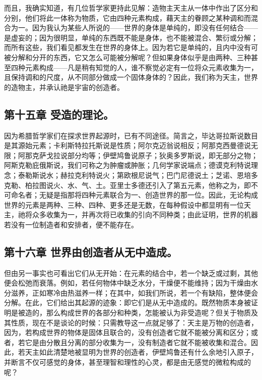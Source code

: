 而且，我确实知道，有几位哲学家更持此见解：造物主天主从一体中作出了区分和分别，他们将此一体称为物质，它由四种元素构成，藉天主的眷顾之某种调和而混合为一。因为我认为某些人所说的——世界的身体是单纯的，即没有任何结合——是虚妄的；因为很明显，单纯的东西既不能是身体，也不能被混合、繁衍或分解；而所有这些，我们看见都发生在世界的身体上。因为若它是单纯的，且内中没有可被分解和分开的东西，它又怎么可能被分解呢？但如果身体似乎是由两种、三种甚至四种元素构成——凡是稍有知觉的人，谁不察觉必定有一位将众元素收集为一，且保持调和的尺度，从不同部分做成一个固体身体的？因此，我们称为天主，世界的造物主，并承认祂是宇宙的创造者。\par


\subsection{第十五章 受造的理论。}

因为希腊哲学家们在探求世界起源时，已有不同途径。简言之，毕达哥拉斯说数目是其源始元素；卡利斯特拉托斯说是性质；阿尔克迈翁说相反；阿那克西曼德说无限；阿那克萨戈拉说部分均等；伊壁鸠鲁说原子；狄奥多罗斯说，即无部分之物；阿斯克勒庇俄斯说，我们可称之为肿瘤或肿胀；几何学家说端点；德谟克利特说理念；泰勒斯说水；赫拉克利特说火；第欧根尼说气；巴门尼德说土；芝诺、恩培多克勒、柏拉图说火、水、气、土。亚里士多德还引入了第五元素，他称之为，即不可命名者；无疑是指那将四种元素联合为一、创造世界的那一位。因此，无论构成世界的元素是两种、三种、四种、更多还是无数，在每种假设中都显明有一位天主，祂将众多收集为一，并再次将已收集的引向不同种类；由此证明，世界的机器若没有一位制造者和安排者，便不能存在。\par


\subsection{第十六章 世界由创造者从无中造成。}

但由另一事实也可看出它们从无开始：在元素的结合中，若一个缺乏或过剩，其他便会松弛而衰落。例如，若任何物体中缺乏水分，干燥便不能维持；因为干燥由水分滋养，正如寒冷由热滋养一样；在其中，如我们所说，若一个有缺陷，整体便会分解。在此，它们给出其起源的迹象：即它们是从无中造成的。既然物质本身被证明是被造的，那么构成世界的各部分和种类，怎能被认为非受造呢？但关于物质及其性质，现在不是谈论的时候：只需教导这一点就足够了：天主是万物的创造者，因为，若构成世界的物体是固体且联合的，没有创造者它就不能被分离和区分；或者，若它是由分散且分离的部分收集为一，没有制造者它就不能被收集和混合。因此，若天主如此清楚地被显明为世界的创造者，伊壁鸠鲁还有什么余地引入原子，并断言不仅可感觉的身体，甚至理智和理性的心灵，都是由无感觉的微粒构成的呢？\par

